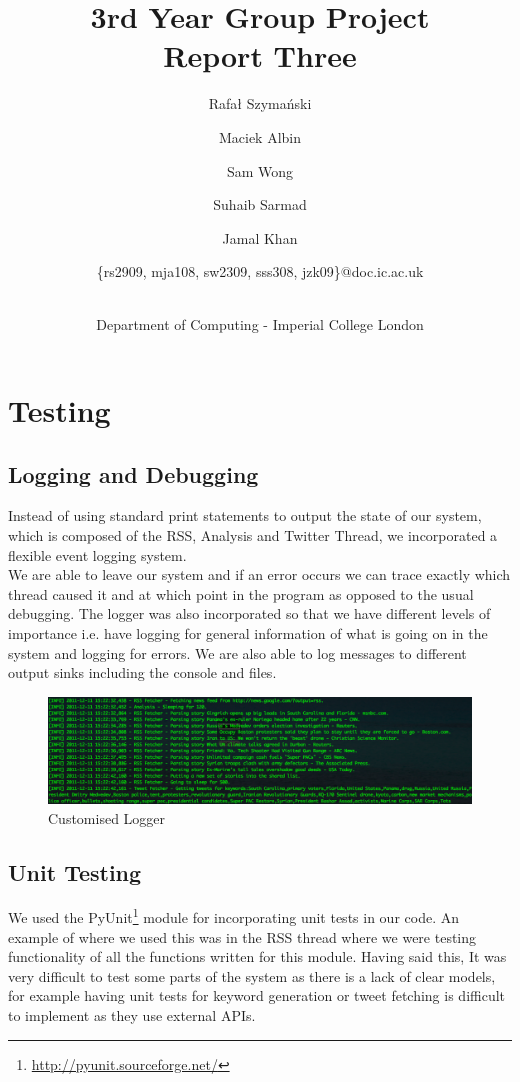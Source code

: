 \documentclass[a4paper,12pt]{article}
\title{3rd Year Group Project\\Report Three\\}
\author{
    \small{Rafał Szymański}\\
  	\and
    \small{Maciek Albin}\\
    \and
    \small{Sam Wong}\\
    \and  
    \small{Suhaib Sarmad}\\
		\and
		\small{Jamal Khan}\\
		\and
		\small{\{rs2909, mja108, sw2309, sss308, jzk09\}@doc.ic.ac.uk}
		\and
		\\Department of Computing - Imperial College London
}
\date{}
\begin{document}
 
	\maketitle
	
	\section{Testing}
	
	  \subsection{Logging and Debugging}
	
	  Instead of using standard print statements to output the state of our system, which is composed of the RSS, Analysis and Twitter Thread, we incorporated a flexible event logging system.\\
	We are able to leave our system and if an error occurs we can trace exactly which thread caused it and at which point in the program as opposed to the usual debugging.
  The logger was also incorporated so that we have different levels of importance i.e. have logging for general information of what is going on in the system and logging for errors. We are also able to log messages to different output sinks including the console and files.
	
	  \begin{figure}[ht!]
				  \centering
					  \includegraphics[scale=0.4]{logger.png}
				    \caption{Customised Logger}
	  \end{figure}
	
	  \subsection{Unit Testing}
	
	  We used the PyUnit\footnote{\url{http://pyunit.sourceforge.net/}} module for incorporating unit tests in our code. An example of where we used this was in the RSS thread where we were testing functionality of all the functions written for this module.
	  Having said this, It was very difficult to test some parts of the system as there is a lack of clear models, for example having unit tests for keyword generation or tweet fetching is difficult to implement as they use external APIs.
	
\end{document}
